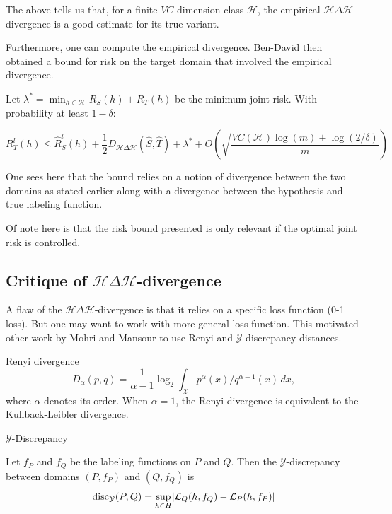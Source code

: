 The above tells us that, for a finite $VC$ dimension class $\mathcal{H}$, the empirical $\mathcal{H}\Delta \mathcal{H}$ divergence is a good estimate for its true variant.

Furthermore, one can compute the empirical divergence. Ben-David then obtained a bound for risk on the target domain that involved the empirical divergence.

\begin{theorem}
	Let $\lambda^* = \min_{h\in \mathcal{H}} R_S(h)+R_T(h)$ be the minimum joint risk.
	With probability at least $1-\delta$:
	
	\[
	R_T^l(h) \leq \hat{R}_S^l(h) + \frac{1}{2}D_{\mathcal{H}\Delta \mathcal{H}}(\hat{S},\hat{T}) + \lambda^{*} + 
	O \left( \sqrt{\frac{VC(\mathcal{H}) \log(m) + \log(2/\delta)}{m}}\right) 
	\]
\end{theorem}

One sees here that the bound relies on a notion of divergence between the two domains as stated earlier along with a divergence between the hypothesis and true labeling function.

Of note here is that the risk bound presented is only relevant if the optimal joint risk is controlled.

\subsection*{Critique of $\mathcal{H}\Delta\mathcal{H}$-divergence}

A flaw of the $\mathcal{H}\Delta\mathcal{H}$-divergence is that it relies on a specific loss function (0-1 loss). But one may want to work with more general loss function. This motivated other work by Mohri and Mansour to use Renyi and $\mathcal{Y}$-discrepancy distances.

\begin{definition}{Renyi divergence}
	\[
	D_{\alpha}(p,q) = \frac{1}{\alpha-1} \log_2 \int_{\mathcal{X}} p^{\alpha}(x)/q^{\alpha-1}(x) \, dx,
	\]
	where $\alpha$ denotes its order. When $\alpha=1$, the Renyi divergence is equivalent to the Kullback-Leibler divergence.
\end{definition}

\begin{definition}{$\mathcal{Y}$-Discrepancy}

	Let $f_P$ and $f_Q$ be the labeling functions on $P$ and $Q$. Then the $\mathcal{Y}$-discrepancy between domains $(P,f_P)$ and $(Q,f_Q)$ is
	\[
	\textrm{disc}_{\mathcal{Y}}(P,Q) = \sup_{h\in H} \lvert\mathcal{L}_Q(h,f_Q)-\mathcal{L}_P(h,f_P)\rvert
	\]
\end{definition}

